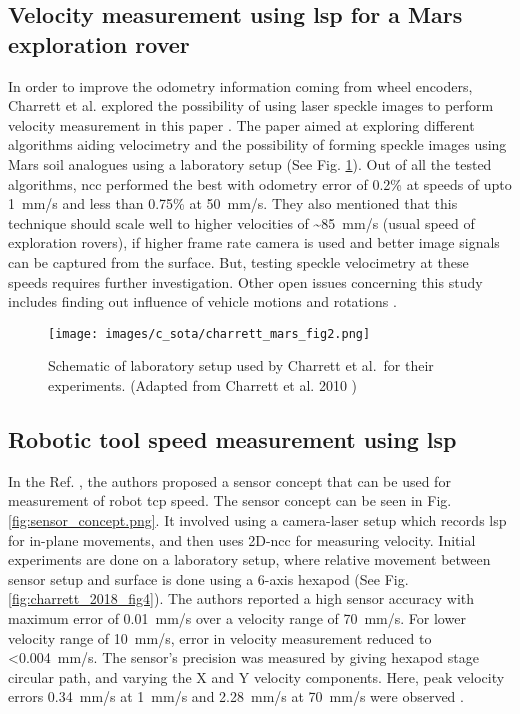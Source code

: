     \subsection{Velocity measurement using \gls{lsp} for a Mars exploration rover}
        In order to improve the odometry information coming from wheel encoders, Charrett et al. explored the possibility of using laser speckle images to perform velocity measurement in this paper \cite{charrett_mars}. The paper aimed at exploring different algorithms aiding velocimetry and the possibility of forming speckle images using Mars soil analogues using a laboratory setup (See Fig. \ref{fig:charrett_mars_fig2.png}). Out of all the tested algorithms, \gls{ncc} performed the best with odometry error of 0.2\% at speeds of upto \SI{1}{\milli\meter/\second} and less than 0.75\% at \SI{50}{\milli\meter/\second}. They also mentioned that this technique should scale well to higher velocities of \sim\SI{85}{\milli\meter/\second} (usual speed of exploration rovers), if higher frame rate camera is used and better image signals can be captured from the surface. But, testing speckle velocimetry at these speeds requires further investigation. Other open issues concerning this study includes finding out influence of vehicle motions and rotations \cite{charrett_mars}.

        \begin{figure}[ht]
            \centering
            \texttt{[image: images/c\_sota/charrett\_mars\_fig2.png]}
            \caption{Schematic of laboratory setup used by Charrett et al.\ for their experiments. (Adapted from Charrett et al. 2010 \cite{charrett_mars})}
            \label{fig:charrett_mars_fig2.png}
        \end{figure}
        
    \subsection{Robotic tool speed measurement using \gls{lsp}} \label{subsection:robotic_tool_speed}
        In the Ref. \cite{charrett_2018}, the authors proposed a sensor concept that can be used for measurement of robot \gls{tcp} speed. The sensor concept can be seen in Fig. \ref{fig:sensor_concept.png}. It involved using a camera-laser setup which records \gls{lsp} for in-plane movements, and then uses 2D-\gls{ncc} for measuring velocity. Initial experiments are done on a laboratory setup, where relative movement between sensor setup and surface is done using a 6-axis hexapod (See Fig. \ref{fig:charrett_2018_fig4}). The authors reported a high sensor accuracy with maximum error of \pm\SI{0.01}{\milli\meter/\second} over a velocity range of \pm\SI{70}{\milli\meter/\second}. For lower velocity range of \pm\SI{10}{\milli\meter/\second}, error in velocity measurement reduced to \textless \SI{0.004}{\milli\meter/\second}. The sensor's precision was measured by giving hexapod stage circular path, and varying the X and Y velocity components. Here, peak velocity errors \SI{0.34}{\milli\meter/\second} at \SI{1}{\milli\meter/\second} and \pm\SI{2.28}{\milli\meter/\second} at \pm\SI{70}{\milli\meter/\second} were observed \cite{charrett_2018}.
        
